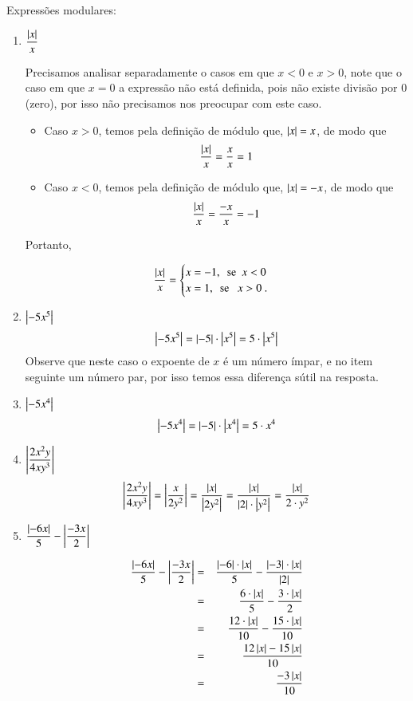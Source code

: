  \begin{exem} Expressões modulares:
 \begin{enumerate}
  \item $\dfrac{\left|x\right|}{x}$

  Precisamos analisar separadamente o casos em que $x<0$ e $x>0$, note que o caso em que $x=0$ a expressão não está definida, pois não existe divisão por $0$ (zero), por isso não precisamos nos preocupar com este caso.

  \begin{itemize}
   \item Caso $x> 0$, temos pela definição de módulo que, $\left|x\right|= x$, de modo que
   \[\dfrac{\left|x\right|}{x}=\dfrac{x}{x}= 1\]
   \item Caso $x< 0$, temos pela definição de módulo que, $\left|x\right|= -x$, de modo que
   \[\dfrac{\left|x\right|}{x}=\dfrac{-x}{x}= -1\]
  \end{itemize}

 Portanto,

  \[ \frac{\left|x\right|}{x} = \begin{cases}
      x= -1, \ \ \text{se} \ \ x< 0 \\
      x= 1, \ \ \text{se } \ \ x> 0 \ .
     \end{cases}
  \]


 \item $\left|-5x^5\right|$
 \[\left|-5x^5\right|= \left|-5\right|\cdot \left|x^5\right|= 5 \cdot \left|x^5\right|\]
 Observe que neste caso o expoente de $x$ é um número ímpar, e no item seguinte um número par, por isso temos essa diferença sútil na resposta.

 \item $\left|-5x^4\right|$
 \[\left|-5x^4\right|= \left|-5\right|\cdot \left|x^4\right|= 5 \cdot x^4\]

 \item $\left|\dfrac{2x^2y}{4xy^3}\right|$
 \[\left|\dfrac{2x^2y}{4xy^3}\right| = \left|\dfrac{x}{2y^2}\right|= \dfrac{\left|x\right|}{\left|2y^2\right|}= \dfrac{\left|x\right|}{\left|2\right| \cdot \left|y^2\right|}= \frac{\left|x\right|}{2 \cdot y^2}\]

 \item $\dfrac{\left|-6x\right|}{5} - \left|\dfrac{-3x}{2}\right|$

 \begin{eqnarray*}
  \dfrac{\left|-6x\right|}{5} - \left|\dfrac{-3x}{2}\right| &=&
 \dfrac{\left|-6\right|\cdot \left|x\right|}{5} - \dfrac{\left|-3\right| \cdot \left|x\right|}{\left|2\right|} \\
 &=& \dfrac{6 \cdot \left|x\right|}{5} - \dfrac{ 3 \cdot \left|x\right|}{2} \\
 &=& \dfrac{12 \cdot \left|x\right|}{10} - \dfrac{15 \cdot \left|x\right|}{10} \\
 &=& \dfrac{12\left|x\right| - 15\left|x\right|}{10} \\
 &=& \dfrac{-3\left|x\right|}{10}
 \end{eqnarray*}
 
\end{enumerate}
\end{exem}

